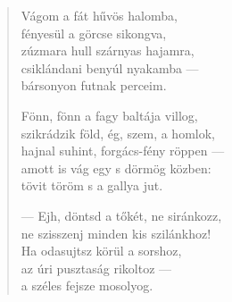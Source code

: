 \documentclass[11pt]{book}
\newcommand*{\centeredornament}{\centerline{\pgfornament[width=6cm]{88}}}
\begin{document}
\begin{verse}
  Vágom a fát hűvös halomba, \\
  fényesül a görcse sikongva, \\
  zúzmara hull szárnyas hajamra, \\
  csiklándani benyúl nyakamba --- \\
  bársonyon futnak perceim.

  Fönn, fönn a fagy baltája villog, \\
  szikrádzik föld, ég, szem, a homlok, \\
  hajnal suhint, forgács-fény röppen --- \\
  amott is vág egy s dörmög közben: \\
  tövit töröm s a gallya jut.

  --- Ejh, döntsd a tőkét, ne siránkozz, \\
  ne szisszenj minden kis szilánkhoz! \\
  Ha odasujtsz körül a sorshoz, \\
  az úri pusztaság rikoltoz --- \\
  a széles fejsze mosolyog.
\end{verse}

\newpage

\vspace*{-15mm}
\centeredornament



\end{document}
